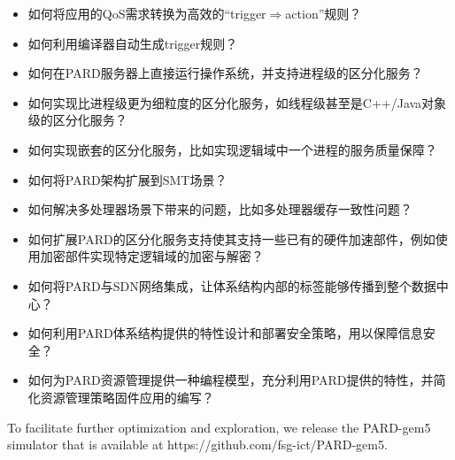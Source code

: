 \begin{itemize}[nolistsep]
  \item 如何将应用的QoS需求转换为高效的``trigger$\Rightarrow$action''规则？
  \item 如何利用编译器自动生成trigger规则？
  \item 如何在PARD服务器上直接运行操作系统，并支持进程级的区分化服务？
  \item 如何实现比进程级更为细粒度的区分化服务，如线程级甚至是C++/Java对象级的区分化服务？
  \item 如何实现嵌套的区分化服务，比如实现逻辑域中一个进程的服务质量保障？
  \item 如何将PARD架构扩展到SMT场景？
  \item 如何解决多处理器场景下带来的问题，比如多处理器缓存一致性问题？
  \item 如何扩展PARD的区分化服务支持使其支持一些已有的硬件加速部件，例如使用加密部件实现特定逻辑域的加密与解密？
  \item 如何将PARD与SDN网络集成，让体系结构内部的标签能够传播到整个数据中心？
  \item 如何利用PARD体系结构提供的特性设计和部署安全策略，用以保障信息安全？
  \item 如何为PARD资源管理提供一种编程模型，充分利用PARD提供的特性，并简化资源管理策略固件应用的编写？
\end{itemize}

To facilitate further optimization and exploration, we
release the PARD-gem5 simulator that is available at
https://github.com/fsg-ict/PARD-gem5.


